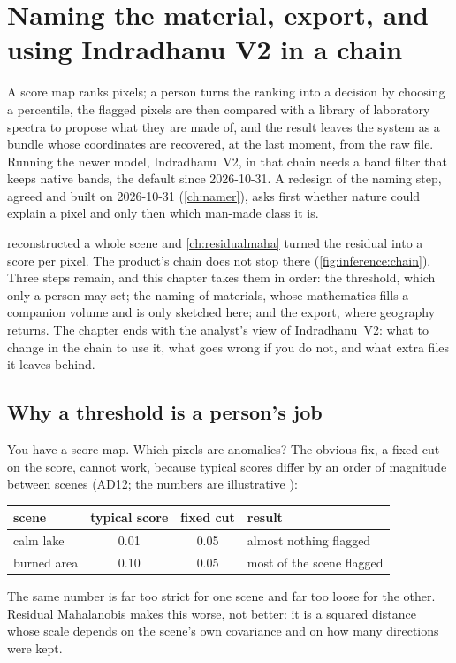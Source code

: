 \chapter{Naming the material, export, and using Indradhanu V2 in a chain}\label{ch:material}

\begin{onething}
A score map ranks pixels; a person turns the ranking into a decision by choosing a percentile, the flagged
pixels are then compared with a library of laboratory spectra to propose what they are made of, and the
result leaves the system as a bundle whose coordinates are recovered, at the last moment, from the raw file.
Running the newer model, Indradhanu~V2, in that chain needs a band filter that keeps native bands, the
default since 2026-10-31. A redesign of the naming step, agreed and built on 2026-10-31 (\cref{ch:namer}),
asks first whether nature could explain a pixel and only then which man-made class it is.
\end{onething}

 reconstructed a whole scene and \cref{ch:residualmaha} turned the residual into a score
per pixel. The product's chain does not stop there (\cref{fig:inference:chain}). Three steps remain, and this
chapter takes them in order: the threshold, which only a person may set; the naming of materials, whose
mathematics fills a companion volume and is only sketched here; and the export, where geography returns.
The chapter ends with the analyst's view of Indradhanu~V2: what to change in the chain to use it, what goes
wrong if you do not, and what extra files it leaves behind.

\section{Why a threshold is a person's job}\label{sec:material:why}

You have a score map. Which pixels are anomalies? The obvious fix, a fixed cut on the score, cannot work,
because typical scores differ by an order of magnitude between scenes (AD12; the numbers are
illustrative \tagA):
\begin{center}\small
\begin{tabular}{@{}lccl@{}}
\toprule
scene & typical score & fixed cut & result\\
\midrule
calm lake & 0.01 & 0.05 & almost nothing flagged\\
burned area & 0.10 & 0.05 & most of the scene flagged\\
\bottomrule
\end{tabular}
\end{center}
The same number is far too strict for one scene and far too loose for the other. Residual Mahalanobis makes
this worse, not better: it is a squared distance whose scale depends on the scene's own covariance and on how
many directions were kept.

